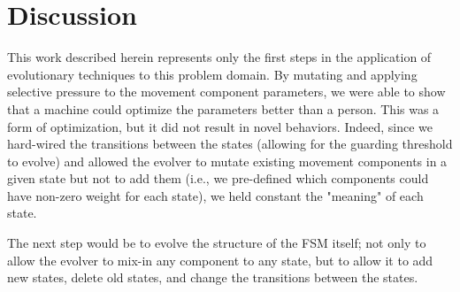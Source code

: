\documentclass[12pt,journal,compsoc]{IEEEtran}
\begin{document}
\section{Discussion}
This work described herein represents only the first steps in the application of evolutionary techniques to this problem domain. By mutating and applying selective pressure to the movement component parameters, we were able to show that a machine could optimize the parameters better than a person. This was a form of optimization, but it did not result in novel behaviors. Indeed, since we hard-wired the transitions between the states (allowing for the guarding threshold to evolve) and allowed the evolver to mutate existing movement components in a given state but not to add them (i.e., we pre-defined which components could have non-zero weight for each state), we held constant the "meaning" of each state.

The next step would be to evolve the structure of the FSM itself; not only to allow the evolver to mix-in any component to any state, but to allow it to add new states, delete old states, and change the transitions between the states.



\end{document}
